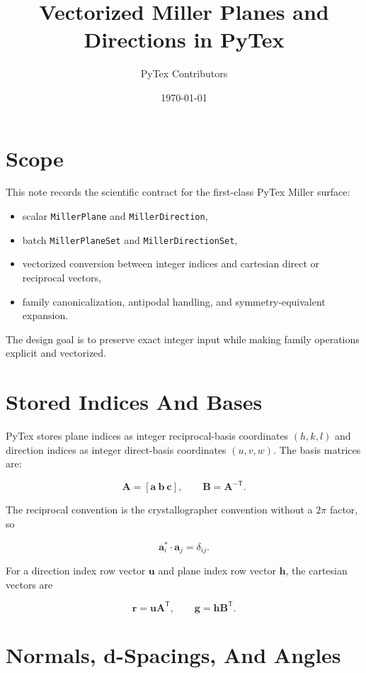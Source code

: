 \documentclass[11pt]{article}
\title{Vectorized Miller Planes and Directions in PyTex}
\author{PyTex Contributors}
\date{\today}
\begin{document}
\maketitle

\section{Scope}

This note records the scientific contract for the first-class PyTex Miller surface:

\begin{itemize}
  \item scalar \texttt{MillerPlane} and \texttt{MillerDirection},
  \item batch \texttt{MillerPlaneSet} and \texttt{MillerDirectionSet},
  \item vectorized conversion between integer indices and cartesian direct or reciprocal vectors,
  \item family canonicalization, antipodal handling, and symmetry-equivalent expansion.
\end{itemize}

The design goal is to preserve exact integer input while making family operations explicit and
vectorized.

\section{Stored Indices And Bases}

PyTex stores plane indices as integer reciprocal-basis coordinates $(h, k, l)$ and direction
indices as integer direct-basis coordinates $(u, v, w)$. The basis matrices are:

\[
\mathbf{A} = [\mathbf{a}\ \mathbf{b}\ \mathbf{c}],
\qquad
\mathbf{B} = \mathbf{A}^{-\mathsf{T}}.
\]

The reciprocal convention is the crystallographer convention without a $2\pi$ factor, so

\[
\mathbf{a}_i^* \cdot \mathbf{a}_j = \delta_{ij}.
\]

For a direction index row vector $\mathbf{u}$ and plane index row vector $\mathbf{h}$, the
cartesian vectors are

\[
\mathbf{r} = \mathbf{u}\mathbf{A}^{\mathsf{T}},
\qquad
\mathbf{g} = \mathbf{h}\mathbf{B}^{\mathsf{T}}.
\]

\section{Normals, d-Spacings, And Angles}
\end{document}
